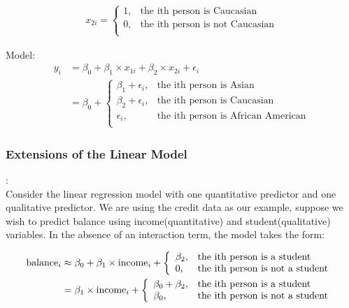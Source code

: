     \documentclass[12pt,fleqn,a4paper]{article}%
\theoremstyle{definition}
\theoremstyle{plain}
\numberwithin{equation}{section}
\begin{document}
\begin{gather}
x_{2i} = \left\{
\begin{array}{ll}
1, & \mbox{the ith person is Caucasian}\\
0, & \mbox{the ith person is not Caucasian}\\
\end{array} \right.
\end{gather}

Model: 
\begin{align}
y_{i} & = \beta_{0}+\beta_{1} \times x_{1i} + \beta_{2} \times x_{2i} + \epsilon_{i} \\ 
      & = \beta_{0} + \left\{
		\begin{array}{ll}
			\beta_{1} +\epsilon_{i}, & \mbox{the ith person is Asian}\\
			\beta_{2} +\epsilon_{i}, & \mbox{the ith person is Caucasian}\\
			\epsilon_{i}, & \mbox{the ith person is African American}\\
		\end{array} \right.
\end{align}

\subsubsection{\textbf{Extensions of the Linear Model}}
\textbf{\color{blue}{Interaction Effect}}:\\
Consider the linear regression model with one quantitative predictor and one qualitative predictor.
 We are using the credit data as our example, suppose we wish to predict balance using income(quantitative) and student(qualitative) variables. 
 In the absence of an interaction term, the model takes the form:

\begin{align}
{\rm balance}_{i} & \approx \beta_{0}+ \beta_{1} \times {\rm income}_{i} + \left\{
		\begin{array}{ll}
			\beta_{2} , & \mbox{the ith person is a student}\\
			0, & \mbox{the ith person is not a student }\\
		\end{array} \right. \\
& = \beta_{1} \times {\rm income}_{i} + \left\{
		\begin{array}{ll}
			\beta_{0} + \beta_{2} , & \mbox{the ith person is a student}\\
			\beta_{0}, & \mbox{the ith person is not a student }\\
		\end{array} \right.
\label{non-interaction}
\end{align}
\end{document}
